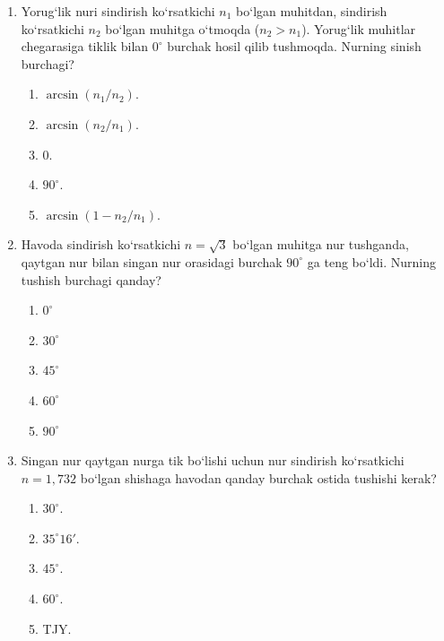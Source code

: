 \begin{enumerate}
\begin{enumerate}[label=\Alph*)]
\item yorug‘lik qutblangan.
\item 2-chi muhitda yorug‘lik tezligi 1-muhitdagidan katta.
\item 2-chi muhitda yorug‘lik tezligi 1-muhitdagidan kichik.
\item 1-muhitning absolyut sindirish ko‘rsatkichi birdan kichik.
\item TJY.
\end{enumerate}

\item Yorug‘lik nuri sindirish ko‘rsatkichi $n_1$ bo‘lgan muhitdan, sindirish ko‘rsatkichi $n_2$ bo‘lgan muhitga o‘tmoqda ($n_2>n_1$). Yorug‘lik muhitlar chegarasiga tiklik bilan $0^\circ$ burchak hosil qilib tushmoqda. Nurning sinish burchagi?
\begin{enumerate}[label=\Alph*)]
\item $\arcsin(n_1/n_2)$.
\item $\arcsin(n_2/n_1)$.
\item $0$.
\item $90^\circ$.
\item $\arcsin(1-n_2/n_1)$.
\end{enumerate}

\item Havoda sindirish ko‘rsatkichi $n=\sqrt{3}$ bo‘lgan muhitga nur tushganda, qaytgan nur bilan singan nur orasidagi burchak $90^\circ$ ga teng bo‘ldi. Nurning tushish burchagi qanday?
\begin{enumerate}[label=\Alph*)]
\item $0^\circ$
\item $30^\circ$
\item $45^\circ$
\item $60^\circ$
\item $90^\circ$
\end{enumerate}


\item Singan nur qaytgan nurga tik bo‘lishi uchun nur sindirish ko‘rsatkichi $n=1{,}732$ bo‘lgan shishaga havodan qanday burchak ostida tushishi kerak?
\begin{enumerate}[label=\Alph*)]
\item $30^\circ$.
\item $35^\circ16'$.
\item $45^\circ$.
\item $60^\circ$.
\item TJY.
\end{enumerate}


\end{enumerate}
